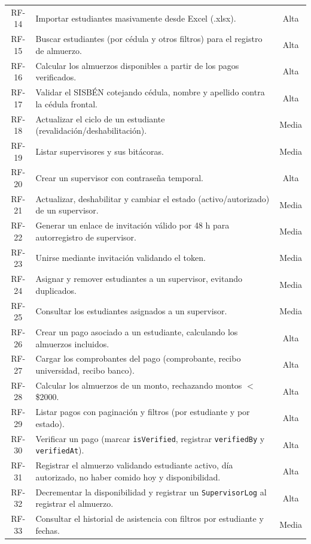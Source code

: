 \documentclass[stu,11pt,floatsintext]{apa7}
\begin{document}
\begin{longtable}{c L{0.62\textwidth} c}
RF-14 & Importar estudiantes masivamente desde Excel (.xlsx). & Alta \\
RF-15 & Buscar estudiantes (por cédula y otros filtros) para el registro de almuerzo. & Alta \\
RF-16 & Calcular los almuerzos disponibles a partir de los pagos verificados. & Alta \\
RF-17 & Validar el SISBÉN cotejando cédula, nombre y apellido contra la cédula frontal. & Alta \\
RF-18 & Actualizar el ciclo de un estudiante (revalidación/deshabilitación). & Media \\
RF-19 & Listar supervisores y sus bitácoras. & Media \\
RF-20 & Crear un supervisor con contraseña temporal. & Alta \\
RF-21 & Actualizar, deshabilitar y cambiar el estado (activo/autorizado) de un supervisor. & Media \\
RF-22 & Generar un enlace de invitación válido por 48 h para autorregistro de supervisor. & Media \\
RF-23 & Unirse mediante invitación validando el token. & Media \\
RF-24 & Asignar y remover estudiantes a un supervisor, evitando duplicados. & Media \\
RF-25 & Consultar los estudiantes asignados a un supervisor. & Media \\
RF-26 & Crear un pago asociado a un estudiante, calculando los almuerzos incluidos. & Alta \\
RF-27 & Cargar los comprobantes del pago (comprobante, recibo universidad, recibo banco). & Alta \\
RF-28 & Calcular los almuerzos de un monto, rechazando montos $<$ \$2000. & Alta \\
RF-29 & Listar pagos con paginación y filtros (por estudiante y por estado). & Alta \\
RF-30 & Verificar un pago (marcar \texttt{isVerified}, registrar \texttt{verifiedBy} y \texttt{verifiedAt}). & Alta \\
RF-31 & Registrar el almuerzo validando estudiante activo, día autorizado, no haber comido hoy y disponibilidad. & Alta \\
RF-32 & Decrementar la disponibilidad y registrar un \texttt{SupervisorLog} al registrar el almuerzo. & Alta \\
RF-33 & Consultar el historial de asistencia con filtros por estudiante y fechas. & Media \\

\end{longtable}
\end{document}
